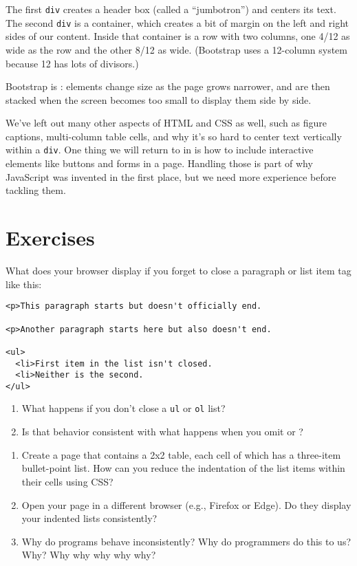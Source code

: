 The first \texttt{div} creates a header box (called a ``jumbotron'') and centers its text.
The second \texttt{div} is a container,
which creates a bit of margin on the left and right sides of our content.
Inside that container is a row with two columns,
one 4/12 as wide as the row and the other 8/12 as wide.
(Bootstrap uses a 12-column system because 12 has lots of divisors.)

Bootstrap is :
elements change size as the page grows narrower,
and are then stacked when the screen becomes too small to display them side by side.

We've left out many other aspects of HTML and CSS as well,
such as figure captions,
multi-column table cells,
and why it's so hard to center text vertically within a \texttt{div}.
One thing we will return to in  is
how to include interactive elements like buttons and forms in a page.
Handling those is part of why JavaScript was invented in the first place,
but we need more experience before tackling them.

\section{Exercises}\label{s:htmlcss-exercises}


What does your browser display if you forget to close a paragraph or list item tag
like this:

\begin{verbatim}
<p>This paragraph starts but doesn't officially end.

<p>Another paragraph starts here but also doesn't end.

<ul>
  <li>First item in the list isn't closed.
  <li>Neither is the second.
</ul>
\end{verbatim}

\begin{enumerate}
\item
  What happens if you don't close a \texttt{ul} or \texttt{ol} list?
\item
  Is that behavior consistent with what happens when you omit \texttt{} or \texttt{}?
\end{enumerate}


\begin{enumerate}
\item
  Create a page that contains a 2x2 table,
  each cell of which has a three-item bullet-point list.
  How can you reduce the indentation of the list items within their cells using CSS?
\item
  Open your page in a different browser (e.g., Firefox or Edge).
  Do they display your indented lists consistently?
\item
  Why do programs behave inconsistently?
  Why do programmers do this to us?
  Why?
  Why why why why why?
\end{enumerate}

